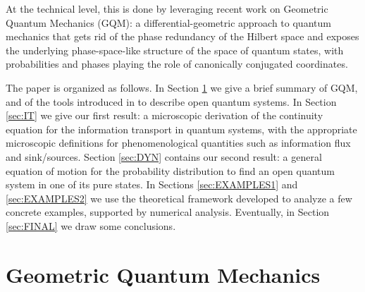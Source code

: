 \documentclass[draft,nofootinbib,pre,twocolumn,showpacs,showkeys,preprintnumbers,floatfix]{revtex4-1}
\newcommand{\1}{\mathbbm{1}}
\begin{document}
At the technical level, this is done by leveraging recent work \cite{Anza20a,Anza20b,Anza20c} on 
Geometric Quantum Mechanics (GQM): a differential-geometric approach to quantum mechanics that 
gets rid of the phase redundancy of the Hilbert space and exposes the underlying phase-space-like
structure of the space of quantum states, with probabilities and phases playing the role of 
canonically conjugated coordinates.

The paper is organized as follows. In Section \ref{sec:GQM} we give a brief summary of 
GQM, and of the tools introduced in \cite{Anza20a,Anza20b} to describe open quantum systems. 
In Section \ref{sec:IT} we give our first result: a microscopic derivation of the continuity equation 
for the information transport in quantum systems, with the appropriate microscopic definitions for 
phenomenological quantities such as information flux and sink/sources. Section \ref{sec:DYN} contains 
our second result: a general equation of motion for the probability distribution to find an open quantum 
system in one of its pure states. In Sections \ref{sec:EXAMPLES1} and \ref{sec:EXAMPLES2} 
we use the theoretical framework developed to analyze a few concrete examples, supported 
by numerical analysis. Eventually, in Section \ref{sec:FINAL} we draw some conclusions. 








\section{Geometric Quantum Mechanics}
\label{sec:GQM}
\end{document}
